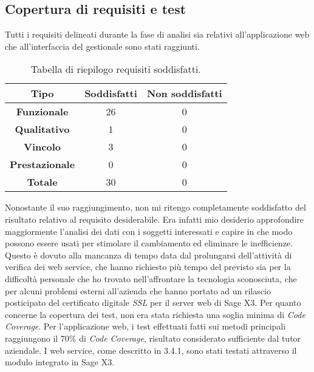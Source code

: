 
\subsection{Copertura di requisiti e test}

Tutti i requisiti delineati durante la fase di analisi sia relativi all'applicazione web che all'interfaccia del gestionale sono stati raggiunti.

\begin{center}
	\begin{longtable}{ | c| c | c|}
		\caption{Tabella di riepilogo requisiti soddisfatti.}\\		
		\hline
		\textbf{Tipo} & \textbf{Soddisfatti} & \textbf{Non soddisfatti} \\
		\hline
		\textbf{Funzionale} & 26 & 0 \\
		\hline
		\textbf{Qualitativo} & 1 & 0 \\
		\hline
		\textbf{Vincolo} & 3 & 0 \\
		\hline
		\textbf{Prestazionale} & 0 & 0 \\
		\hline
		\textbf{Totale} & 30 & 0 \\
		\hline
	\end{longtable}
\end{center}

Nonostante il suo raggiungimento, non mi ritengo completamente soddisfatto del risultato relativo al requisito desiderabile. Era infatti mio desiderio approfondire maggiormente l'analisi dei dati con i soggetti interessati e capire in che modo possono essere usati per stimolare il cambiamento ed eliminare le inefficienze.
Questo è dovuto alla mancanza di tempo data dal prolungarsi dell'attività di verifica dei web service, che hanno richiesto più tempo del previsto sia per la difficoltà personale che ho trovato nell'affrontare la tecnologia sconosciuta, che per alcuni problemi esterni all'azienda che hanno portato ad un rilascio posticipato del certificato digitale \textit{SSL} per il server web di Sage X3.
Per quanto concerne la copertura dei test, non era stata richiesta una soglia minima di \textit{Code Coverage}. Per l'applicazione web, i test effettuati fatti sui metodi principali raggiungono il 70\% di \textit{Code Coverage}, risultato considerato sufficiente dal tutor aziendale.
I web service, come descritto in 3.4.1, sono stati testati attraverso il modulo integrato in Sage X3.


